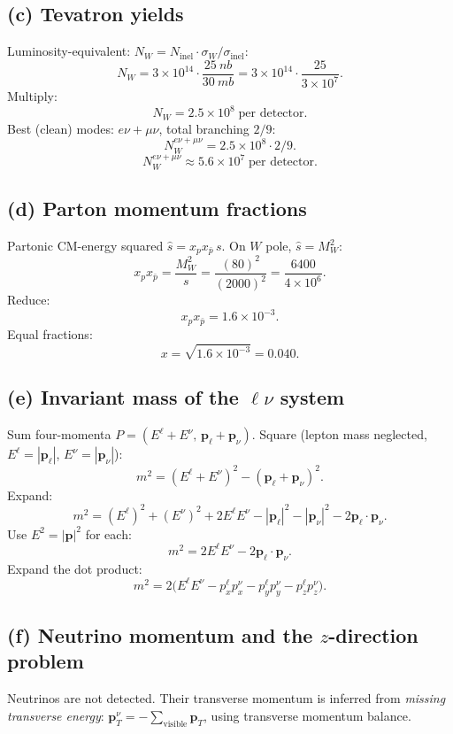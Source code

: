 \documentclass[11pt]{article}
\begin{document}
\subsection*{(c) Tevatron yields}

Luminosity-equivalent: $N_W = N_\text{inel}\cdot\sigma_W/\sigma_\text{inel}$:
\[
N_W = 3\times 10^{14}\cdot\frac{\SI{25}{nb}}{\SI{30}{mb}} = 3\times 10^{14}\cdot\frac{25}{3\times 10^7}.
\]
Multiply:
\[
\boxed{\;N_W = 2.5\times 10^{8}\;\text{per detector}.\;}
\]
Best (clean) modes: $e\nu+\mu\nu$, total branching $2/9$:
\[
N_W^{e\nu+\mu\nu} = 2.5\times 10^{8}\cdot 2/9.
\]
\[
\boxed{\;N_W^{e\nu+\mu\nu} \approx 5.6\times 10^{7}\;\text{per detector}.\;}
\]

\subsection*{(d) Parton momentum fractions}

Partonic CM-energy squared $\hat s = x_p x_{\bar p}\,s$. On $W$ pole, $\hat s = M_W^2$:
\[
x_p x_{\bar p} = \frac{M_W^2}{s} = \frac{(80)^2}{(2000)^2} = \frac{6400}{4\times 10^6}.
\]
Reduce:
\[
\boxed{\;x_p x_{\bar p} = 1.6\times 10^{-3}.\;}
\]
Equal fractions:
\[
\boxed{\;x = \sqrt{1.6\times 10^{-3}} = 0.040.\;}
\]

\subsection*{(e) Invariant mass of the $\ell\nu$ system}

Sum four-momenta $P=(E^\ell+E^\nu,\,\bm p_\ell+\bm p_\nu)$. Square (lepton mass neglected, $E^\ell=|\bm p_\ell|$, $E^\nu=|\bm p_\nu|$):
\[
m^2 = (E^\ell+E^\nu)^2 - (\bm p_\ell+\bm p_\nu)^2.
\]
Expand:
\[
m^2 = (E^\ell)^2 + (E^\nu)^2 + 2E^\ell E^\nu - |\bm p_\ell|^2 - |\bm p_\nu|^2 - 2\bm p_\ell\cdot\bm p_\nu.
\]
Use $E^2 = |\bm p|^2$ for each:
\[
m^2 = 2E^\ell E^\nu - 2\bm p_\ell\cdot\bm p_\nu.
\]
Expand the dot product:
\[
\boxed{\;m^2 = 2\bigl(E^\ell E^\nu - p^\ell_x p^\nu_x - p^\ell_y p^\nu_y - p^\ell_z p^\nu_z\bigr).\;}
\]

\subsection*{(f) Neutrino momentum and the $z$-direction problem}

Neutrinos are not detected. Their transverse momentum is inferred from \emph{missing transverse energy}: $\bm p_T^\nu = -\sum_\text{visible}\bm p_T$, using transverse momentum balance.
\end{document}
